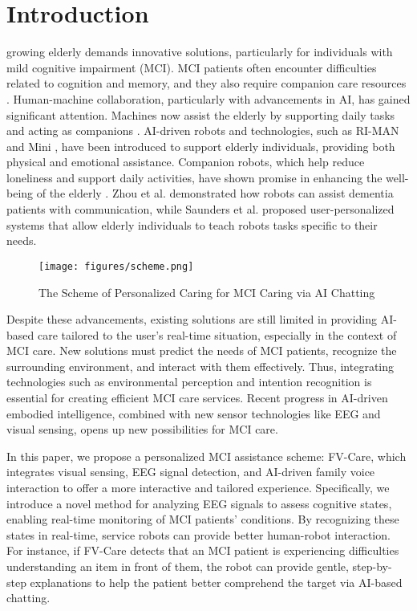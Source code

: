 \documentclass[conference]{IEEEtran}
\begin{document}
\section{Introduction} \label{sec: intro}
 growing elderly demands innovative solutions, particularly for individuals with mild cognitive impairment (MCI). MCI patients often encounter difficulties related to cognition and memory, and they also require companion care resources \cite{frech2024}.  Human-machine collaboration, particularly with advancements in AI, has gained significant attention. Machines now assist the elderly by supporting daily tasks and acting as companions \cite{li2023}. AI-driven robots and technologies, such as RI-MAN \cite{robot1} and Mini \cite{robot2}, have been introduced to support elderly individuals, providing both physical and emotional assistance. Companion robots, which help reduce loneliness and support daily activities, have shown promise in enhancing the well-being of the elderly \cite{Companion_Robots_Loneliness_2023}. Zhou et al. \cite{Assistant_Robot_Dementia_2022} demonstrated how robots can assist dementia patients with communication, while Saunders et al. \cite{Teach_Me_Show_Me_2016} proposed user-personalized systems that allow elderly individuals to teach robots tasks specific to their needs.





\begin{figure*}[h]
    \centering
\texttt{[image: figures/scheme.png]}%
    \caption{The Scheme of Personalized Caring for MCI Caring via AI Chatting}
    \label{fig:scheme}
    \vspace{-0.5cm}
\end{figure*}


Despite these advancements, existing solutions are still limited in providing AI-based care tailored to the user's real-time situation, especially in the context of MCI care. New solutions must predict the needs of MCI patients, recognize the surrounding environment, and interact with them effectively. Thus, integrating technologies such as environmental perception and intention recognition is essential for creating efficient MCI care services. Recent progress in AI-driven embodied intelligence, combined with new sensor technologies like EEG and visual sensing, opens up new possibilities for MCI care. 

In this paper, we propose a personalized MCI assistance scheme: FV-Care, which integrates visual sensing, EEG signal detection, and AI-driven family voice interaction to offer a more interactive and tailored experience. Specifically, we introduce a novel method for analyzing EEG signals to assess cognitive states, enabling real-time monitoring of MCI patients' conditions. By recognizing these states in real-time, service robots can provide better human-robot interaction. For instance, if FV-Care detects that an MCI patient is experiencing difficulties understanding an item in front of them, the robot can provide gentle, step-by-step explanations to help the patient better comprehend the target via AI-based chatting.
\end{document}
